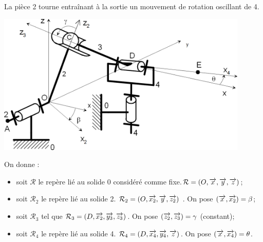 \documentclass[10pt,oneside]{article}
\begin{document}
\begin{exemple}
\begin{center}
\begin{tabular}{cc}
\end{tabular}
\end{center}

La pièce 2 tourne entraînant à la sortie un mouvement de rotation oscillant de 4.

\begin{center}
\includegraphics[width=12cm]{png/melangeur_5} 
\end{center}

On donne :
\begin{itemize}
\item soit $\mathcal{R}$ le repère lié au solide 0 considéré comme fixe.$\mathcal{R}=\left(O,\overrightarrow{x},\overrightarrow{y},\overrightarrow{z}\right)$;
\item soit $\mathcal{R}_2$  le repère lié au solide 2. $\mathcal{R}_2 = \left(O,\overrightarrow{x_2},\overrightarrow{y},\overrightarrow{z_2}\right)$ . On pose  $\left(\overrightarrow{x},\overrightarrow{x_2} \right) = \beta$;
\item soit $\mathcal{R}_3$ tel que $\mathcal{R}_3 = \left(D,\overrightarrow{x_2},\overrightarrow{y_3},\overrightarrow{z_3}\right)$. On pose $\left(\overrightarrow{z_2},\overrightarrow{z_3} \right) = \gamma$ (constant);
\item soit $\mathcal{R}_4$ le repère lié au solide 4. $\mathcal{R}_4 = \left(D,\overrightarrow{x_4},\overrightarrow{y_4},\overrightarrow{z}\right)$. On pose   $\left(\overrightarrow{x},\overrightarrow{x_4} \right) = \theta$.
\end{itemize}


\end{exemple}
\end{document}

